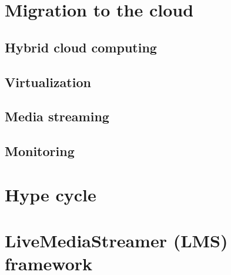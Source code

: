 \section{Migration to the cloud}


\subsection{Hybrid cloud computing}


\subsection{Virtualization}


\subsection{Media streaming}


\subsection{Monitoring}


\section{Hype cycle}


\section{LiveMediaStreamer (LMS) framework}







